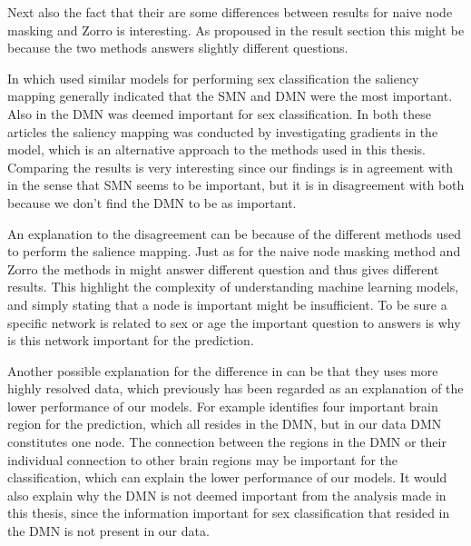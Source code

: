 Next also the fact that their are some differences between results for naive node masking and Zorro is interesting. As propoused in the result section this might be because the two methods answers slightly different questions. 



In \cite{understanding_gnn} which used similar models for performing sex classification the saliency mapping generally indicated that the SMN and DMN were the most important. Also in \cite{arslan} the DMN was deemed important for sex classification. In both these articles the  saliency mapping was conducted  by investigating gradients in the model, which is an alternative approach to the methods used in this thesis. Comparing the results is very interesting since our findings is in agreement with \cite{understanding_gnn} in the sense that SMN seems to be important, but it is in disagreement with both \cite{gin, arslan} because we don't find the DMN to be as important. 

An explanation to the disagreement can be because of the different methods used to perform the salience mapping. Just as for the naive node masking method and Zorro the methods in \cite{understanding_gnn, arslan} might answer different question and thus gives different results. This highlight the complexity of understanding machine learning models, and simply stating that a node is important might be insufficient. To be sure a specific network is related to sex or age the important question to answers is why is this network important for the prediction. 

Another possible explanation for the difference in \cite{understanding_gnn, arslan} can be that they uses more highly resolved data, which previously has been regarded as an explanation of the lower performance of our models. For example \cite{arslan} identifies four important brain region for the prediction, which all resides in the DMN, but in our data DMN constitutes one node. The connection between the regions in the DMN or their individual connection to other brain regions may be important for the classification, which can explain the lower performance of our models. It would also explain why the DMN is not deemed important from the analysis made in this thesis, since the information important for sex classification that resided in the DMN is not present in our data.





